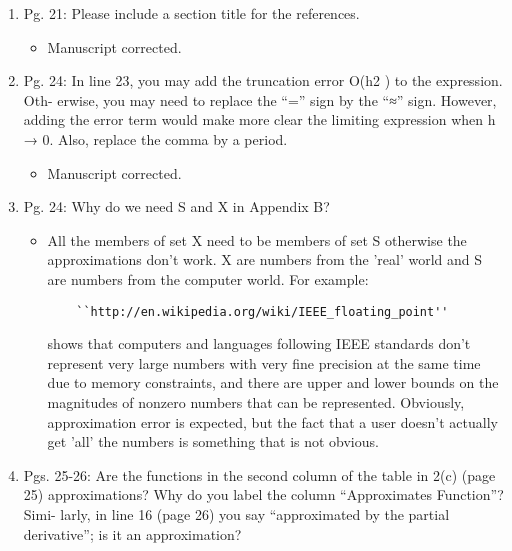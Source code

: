 \documentclass{article}
\begin{document}
\begin{enumerate}
 \item
    Pg. 21: Please include a section title for the references.

{\color{red}  
\begin{itemize}
     \item
         Manuscript corrected.
  \end{itemize}}

 \item
    Pg. 24: In line 23, you may add the truncation error O(h2 ) to the expression. Oth-
    erwise, you may need to replace the “=” sign by the “≈” sign. However, adding
    the error term would make more clear the limiting expression when h → 0. Also,
    replace the comma by a period.

{\color{red}  
\begin{itemize}
     \item
         Manuscript corrected.
  \end{itemize}}

\item    
Pg. 24: Why do we need S and X in Appendix B?

{\color{red}  
\begin{itemize}
     \item

     All the members of set X need to be members of set S otherwise the
     approximations don't work. X are numbers from the 'real' world and S are
     numbers from the computer world. For example:

     \begin{verbatim}
    ``http://en.wikipedia.org/wiki/IEEE_floating_point''
     \end{verbatim}
     
     shows that computers
     and languages following IEEE standards don't represent very large numbers
     with very fine precision at the same time due to memory constraints, and
     there are upper and lower bounds on the magnitudes of nonzero numbers that
     can be represented. Obviously, approximation error is expected, but the
     fact that a user doesn't actually get 'all' the numbers is something that
     is not obvious.

  \end{itemize}}


\item
    Pgs. 25-26: Are the functions in the second column of the table in 2(c) (page 25)
    approximations? Why do you label the column “Approximates Function”? Simi-
    larly, in line 16 (page 26) you say “approximated by the partial derivative”; is it an
    approximation?


\end{enumerate}
\end{document}
